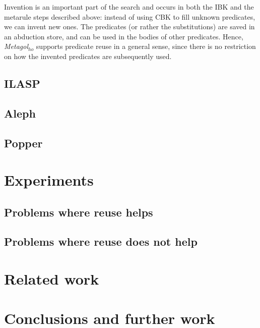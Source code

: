 \documentclass{article}
\theoremstyle{definition}
\begin{document}
\par Invention is an important part of the search and occurs in both the IBK and the metarule steps described above: instead of using CBK to fill unknown predicates, we can invent new ones. The predicates (or rather the substitutions) are saved in an abduction store, and can be used in the bodies of other predicates. Hence, \emph{Metagol$_{ho}$} supports predicate reuse in a general sense, since there is no restriction on how the invented predicates are subsequently used.

\subsection{ILASP}

\subsection{Aleph}

\subsection{Popper}



\section{Experiments}
\subsection{Problems where reuse helps}

\subsection{Problems where reuse does not help}




\section{Related work}



\section{Conclusions and further work}








\end{document}
